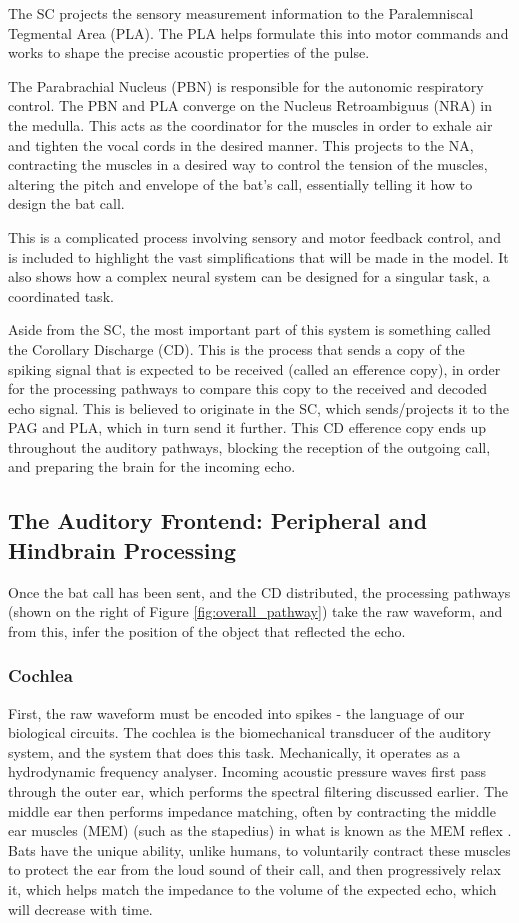 The SC projects the sensory measurement information to the Paralemniscal Tegmental Area (PLA). The PLA helps formulate this into motor commands and works to shape the precise acoustic properties of the pulse. 

The Parabrachial Nucleus (PBN) is responsible for the autonomic respiratory control. The PBN and PLA converge on the Nucleus Retroambiguus (NRA) in the medulla. This acts as the coordinator for the muscles in order to exhale air and tighten the vocal cords in the desired manner. This projects to the NA, contracting the muscles in a desired way to control the tension of the muscles, altering the pitch and envelope of the bat's call, essentially telling it how to design the bat call.

This is a complicated process involving sensory and motor feedback control, and is included to highlight the vast simplifications that will be made in the model. It also shows how a complex neural system can be designed for a singular task, a coordinated task.

Aside from the SC, the most important part of this system is something called the Corollary Discharge (CD). This is the process that sends a copy of the spiking signal that is expected to be received (called an efference copy), in order for the processing pathways to compare this copy to the received and decoded echo signal. This is believed to originate in the SC, which sends/projects it to the PAG and PLA, which in turn send it further. This CD efference copy ends up throughout the auditory pathways, blocking the reception of the outgoing call, and preparing the brain for the incoming echo.


\subsection{The Auditory Frontend: Peripheral and Hindbrain Processing}

Once the bat call has been sent, and the CD distributed, the processing pathways (shown on the right of Figure \ref{fig:overall_pathway}) take the raw waveform, and from this, infer the position of the object that reflected the echo.

\subsubsection{Cochlea}

First, the raw waveform must be encoded into spikes - the language of our biological circuits. The cochlea is the biomechanical transducer of the auditory system, and the system that does this task. Mechanically, it operates as a hydrodynamic frequency analyser. Incoming acoustic pressure waves first pass through the outer ear, which performs the spectral filtering discussed earlier. The middle ear then performs impedance matching, often by contracting the middle ear muscles (MEM) (such as the stapedius) in what is known as the MEM reflex \cite{Winter2023PartCambridge}. Bats have the unique ability, unlike humans, to voluntarily contract these muscles to protect the ear from the loud sound of their call, and then progressively relax it, which helps match the impedance to the volume of the expected echo, which will decrease with time.


